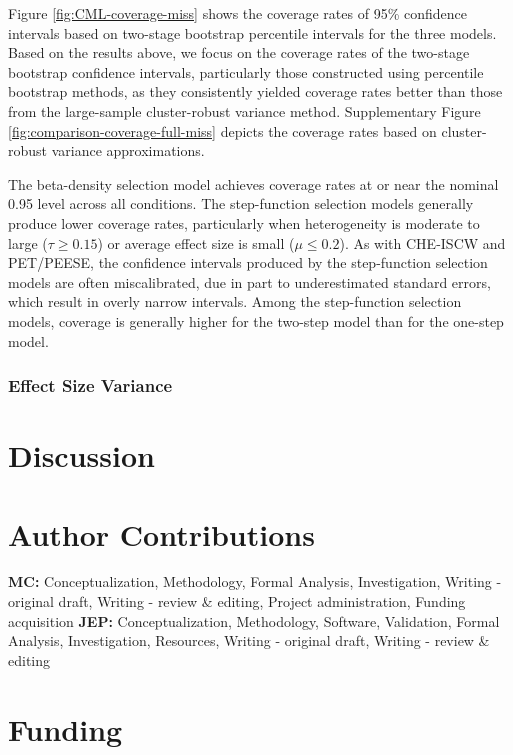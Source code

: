 \documentclass[
  man, donotrepeattitle,floatsintext]{apa7}
\begin{document}
Figure \ref{fig:CML-coverage-miss} shows the coverage rates of 95\% confidence intervals based on two-stage bootstrap percentile intervals for the three models.
Based on the results above, we focus on the coverage rates of the two-stage bootstrap confidence intervals, particularly those constructed using percentile bootstrap methods, as they consistently yielded coverage rates better than those from the large-sample cluster-robust variance method.
Supplementary Figure \ref{fig:comparison-coverage-full-miss} depicts the coverage rates based on cluster-robust variance approximations.

The beta-density selection model achieves coverage rates at or near the nominal 0.95 level across all conditions.
The step-function selection models generally produce lower coverage rates, particularly when heterogeneity is moderate to large (\(\tau \geq 0.15\)) or average effect size is small (\(\mu \leq 0.2\)).
As with CHE-ISCW and PET/PEESE, the confidence intervals produced by the step-function selection models are often miscalibrated, due in part to underestimated standard errors, which result in overly narrow intervals.
Among the step-function selection models, coverage is generally higher for the two-step model than for the one-step model.

\subsubsection{Effect Size Variance}\label{effect-size-variance}

\section{Discussion}\label{discussion}

\section*{Author Contributions}\label{author-contributions}

\textbf{MC:} Conceptualization, Methodology, Formal Analysis, Investigation, Writing - original draft, Writing - review \& editing, Project administration, Funding acquisition \textbf{JEP:} Conceptualization, Methodology, Software, Validation, Formal Analysis, Investigation, Resources, Writing - original draft, Writing - review \& editing

\section*{Funding}\label{funding}
\end{document}
